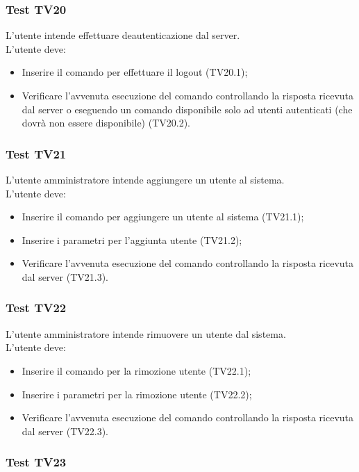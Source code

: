 \documentclass{scalatekids-article}
\begin{document}
\subsubsection{Test TV20}

L'utente intende effettuare deautenticazione dal server.\\
L'utente deve:
\begin{itemize}
\item Inserire il comando per effettuare il logout (TV20.1);
\item Verificare l'avvenuta esecuzione del comando controllando la risposta ricevuta dal server o eseguendo un comando disponibile solo ad utenti autenticati (che dovrà non essere disponibile) (TV20.2).
\end{itemize}

\subsubsection{Test TV21}

L'utente amministratore intende aggiungere un utente al sistema.\\
L'utente deve:
\begin{itemize}
\item Inserire il comando per aggiungere un utente al sistema (TV21.1);
\item Inserire i parametri per l'aggiunta utente (TV21.2);
\item Verificare l'avvenuta esecuzione del comando controllando la risposta ricevuta dal server (TV21.3).
\end{itemize}

\subsubsection{Test TV22}

L'utente amministratore intende rimuovere un utente dal sistema.\\
L'utente deve:
\begin{itemize}
\item Inserire il comando per la rimozione utente (TV22.1);
\item Inserire i parametri per la rimozione utente (TV22.2);
\item Verificare l'avvenuta esecuzione del comando controllando la risposta ricevuta dal server (TV22.3).
\end{itemize}

\subsubsection{Test TV23}
\end{document}
